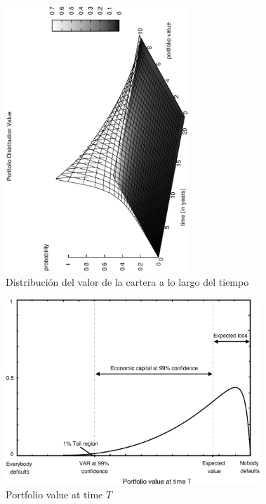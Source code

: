 \begin{figure}[!hb]
\begin{center}
\includegraphics[height=10cm, angle=-90]{./images/pdistrib.ps}
\caption{Distribuci\'on del valor de la cartera a lo largo del tiempo}
\label{pdistrib}
\end{center}
\end{figure}

\begin{figure}[!hb]
\begin{center}
\includegraphics[height=7cm, angle=0]{./images/creditvar.eps}
\caption{Portfolio value at time $T$}
\label{creditvar}
\end{center}
\end{figure}

